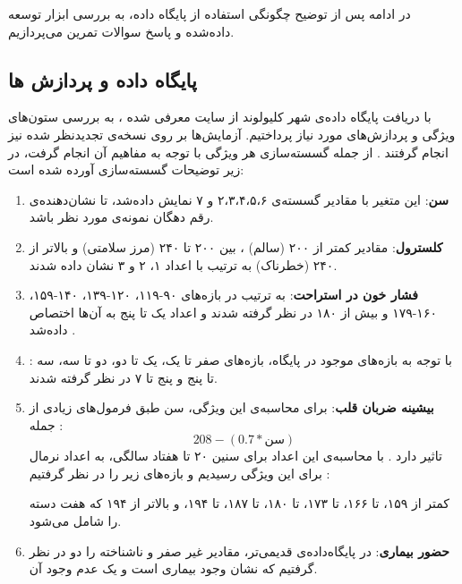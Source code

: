 \documentclass[11.5pt,a4paper]{article}
\begin{document}
در ادامه پس از توضیح چگونگی استفاده از پایگاه داده، به بررسی ابزار توسعه داده‌شده و پاسخ سوالات تمرین می‌پردازیم. 
{\large{\frownie}}

\subsection{پایگاه داده و پردازش ها}

با دریافت پایگاه‌ داده‌ی شهر کلیولوند از سایت معرفی شده
، به بررسی ستون‌های ویژگی و پردازش‌های مورد نیاز پرداختیم. آزمایش‌ها بر روی نسخه‌ی تجدیدنظر شده نیز انجام گرفتند
. از جمله گسسته‌سازی هر ویژگی با توجه به مفاهیم آن انجام گرفت، در زیر توضیحات گسسته‌سازی آورده شده است: 
\begin{enumerate}
\item{\textbf{سن}}: 
این متغیر با مقادیر گسسته‌ی ۲،۳،۴،۵،۶ و ۷ نمایش‌ داده‌شد، تا نشان‌دهنده‌ی رقم دهگان نمونه‌ی مورد نظر باشد.

\item{\textbf{کلسترول}}: 
مقادیر کمتر از ۲۰۰ (سالم) ، بین ۲۰۰ تا ۲۴۰ (مرز سلامتی) و بالاتر از ۲۴۰ (خطرناک) به ترتیب با اعداد ۱، ۲ و ۳ نشان داده شدند. 

\item{\textbf{فشار خون در استراحت}}: 
به ترتیب در بازه‌های ۹۰-۱۱۹، ۱۲۰-۱۳۹، ۱۴۰-۱۵۹، ۱۶۰-۱۷۹ و بیش از ۱۸۰ در نظر گرفته شدند و اعداد یک تا پنج به آن‌ها اختصاص داده‌شد
.
\item{\textbf{}}: 
با توجه به بازه‌های موجود در پایگاه، بازه‌های صفر تا یک، یک تا دو، دو تا سه، سه تا پنج و پنج تا ۷ در نظر گرفته شدند. 
\item{\textbf{بیشینه ضربان قلب}}: 
برای محاسبه‌ی این ویژگی، سن طبق فرمول‌های زیادی از جمله :
$$208 - (0.7 * \text{سن} )$$
تاثیر دارد
. 
با محاسبه‌ی این اعداد برای سنین ۲۰ تا هفتاد سالگی، به اعداد نرمال برای این ویژگی رسیدیم و بازه‌های زیر را در نظر گرفتیم : 

کمتر از ۱۵۹، تا ۱۶۶، تا ۱۷۳، تا ۱۸۰، تا ۱۸۷، تا ۱۹۴، و بالاتر از ۱۹۴ که هفت دسته را شامل می‌شود.
\item{\textbf{حضور بیماری}}: 
در پایگاه‌داده‌ی قدیمی‌تر، مقادیر غیر صفر و ناشناخته را دو در نظر گرفتیم که نشان وجود بیماری است و یک عدم وجود آن. 

\end{enumerate}
\end{document}
